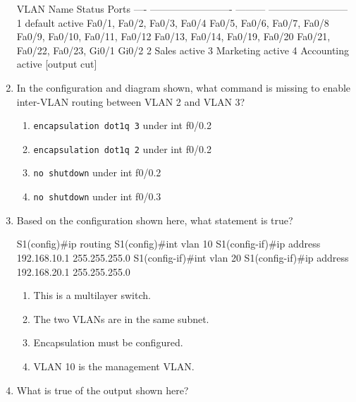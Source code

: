 \begin{enumerate}
\begin{cli}
VLAN Name                       Status    Ports
---- ------------------------- --------- ------------------------
1    default                    active   Fa0/1, Fa0/2, Fa0/3, Fa0/4
                                         Fa0/5, Fa0/6, Fa0/7, Fa0/8
                                       Fa0/9, Fa0/10, Fa0/11, Fa0/12
                                      Fa0/13, Fa0/14, Fa0/19, Fa0/20
                                      Fa0/21, Fa0/22, Fa0/23, Gi0/1
                                          Gi0/2
2    Sales                      active
3    Marketing                  active
4    Accounting                 active
[output cut]
\end{cli}
\item
  In the configuration and diagram shown, what command is missing to
  enable inter-VLAN routing between VLAN 2 and VLAN 3?

  \begin{figure}
  \centering
  \caption{}
  \end{figure}

  \begin{enumerate}
    \item
    \texttt{encapsulation\ dot1q\ 3} under int f0/0.2
  \item
    \texttt{encapsulation\ dot1q\ 2} under int f0/0.2
  \item
    \texttt{no\ shutdown} under int f0/0.2
  \item
    \texttt{no\ shutdown} under int f0/0.3
  \end{enumerate}
\item
   Based on the
  configuration shown here, what statement is true?

\begin{cli}
S1(config)#ip routing
S1(config)#int vlan 10
S1(config-if)#ip address 192.168.10.1 255.255.255.0
S1(config-if)#int vlan 20
S1(config-if)#ip address 192.168.20.1 255.255.255.0
\end{cli}

  \begin{enumerate}
    \item
    This is a multilayer switch.
  \item
    The two VLANs are in the same subnet.
  \item
    Encapsulation must be configured.
  \item
    VLAN 10 is the management VLAN.
  \end{enumerate}
\item
  What is true of the output shown here?


\end{enumerate}
